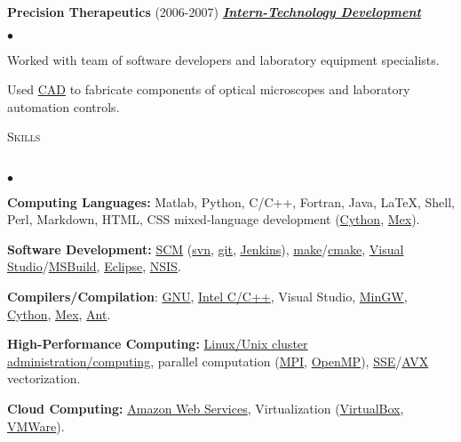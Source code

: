 \documentclass{article}
\newcommand{\lineunder}{\vspace*{-8pt} \\ \hspace*{-18pt} \hrulefill \\}
\newcommand{\header}[1]{{\hspace*{-15pt}\vspace*{6pt} \textsc{#1}} \vspace*{-6pt} \lineunder}
\newcommand{\employer}[3]{{ \textbf{#1} (#2) \underline{\textbf{\emph{#3}}}\\  }}
\newenvironment{achievements}{\begin{list}{$\bullet$}{\topsep 0pt \itemsep -2pt}}{\vspace*{4pt}\end{list}}
\begin{document}
\employer{Precision Therapeutics}{2006-2007}{Intern-Technology Development}
	\begin{achievements}
	\item Worked with team of software developers and laboratory equipment specialists.
	\item Used \href{http://en.wikipedia.org/wiki/Computer-aided_design}{CAD} to fabricate components of optical microscopes and laboratory automation controls. 
	\end{achievements}

\header{Skills}
\begin{achievements}

\item \textbf{Computing Languages:} Matlab, Python, C/C++, Fortran, Java, \LaTeX, Shell, Perl, Markdown, HTML, CSS mixed-language development (\href{http://cython.org/}{Cython}, \href{http://www.mathworks.com/help/matlab/ref/mex.html}{Mex}).

\item \textbf{Software Development:} \href{http://en.wikipedia.org/wiki/Software_configuration_management}{SCM} (\href{http://subversion.apache.org/}{svn}, \href{http://git-scm.com/}{git}, \href{http://jenkins-ci.org/}{Jenkins}), \href{http://www.gnu.org/software/make/}{make}/\href{http://www.cmake.org/}{cmake}, \href{http://www.visualstudio.com/}{Visual Studio}/\href{http://en.wikipedia.org/wiki/MSBuild}{MSBuild}, \href{http://www.eclipse.org/}{Eclipse}, \href{http://nsis.sourceforge.net/Main_Page}{NSIS}. 

\item \textbf{Compilers/Compilation}: \href{http://gcc.gnu.org/}{GNU}, \href{https://software.intel.com/en-us/c-compilers}{Intel C/C++}, Visual Studio, \href{http://www.mingw.org/}{MinGW}, \href{http://cython.org/}{Cython}, \href{http://www.mathworks.com/help/matlab/ref/mex.html}{Mex}, \href{http://ant.apache.org/}{Ant}.

\item \textbf{High-Performance Computing:} \href{http://en.wikipedia.org/wiki/Beowulf_cluster}{Linux/Unix cluster administration/computing}, parallel computation (\href{http://en.wikipedia.org/wiki/Message_Passing_Interface}{MPI}, \href{http://en.wikipedia.org/wiki/OpenMP}{OpenMP}), \href{http://en.wikipedia.org/wiki/Streaming_SIMD_Extensions}{SSE}/\href{http://en.wikipedia.org/wiki/Advanced_Vector_Extensions}{AVX} vectorization.

\item \textbf{Cloud Computing:} \href{http://aws.amazon.com/}{Amazon Web Services}, Virtualization (\href{https://www.virtualbox.org/}{VirtualBox}, \href{http://www.vmware.com/}{VMWare}).


\end{achievements}
\end{document}
